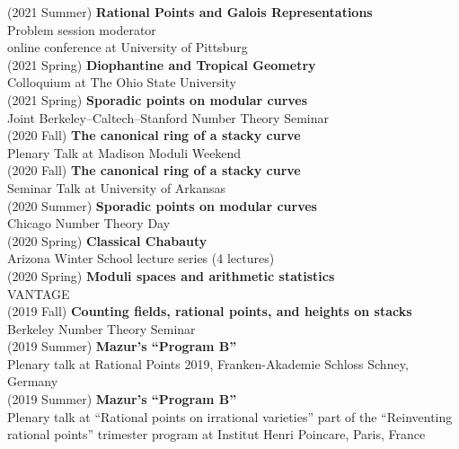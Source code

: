 \documentclass[margin,line]{res}
\begin{document}
\begin{resume}
(2021 Summer) \textbf{Rational Points and Galois Representations}\\
Problem session moderator\\ online conference at University of Pittsburg
\vspace{.05cm}\\
(2021 Spring) \textbf{Diophantine and Tropical Geometry}\\
Colloquium at The Ohio State University 
\vspace{.05cm}\\
(2021 Spring) \textbf{Sporadic points on modular curves}\\
Joint Berkeley--Caltech--Stanford Number Theory Seminar
\vspace{.05cm}\\
(2020 Fall) \textbf{The canonical ring of a stacky curve}\\  
Plenary Talk at Madison Moduli Weekend 
\vspace{.05cm}\\
(2020 Fall) \textbf{The canonical ring of a stacky curve}\\  
Seminar Talk at University of Arkansas
\vspace{.05cm}\\
(2020 Summer) \textbf{Sporadic points on modular curves}\\
Chicago Number Theory Day 
\vspace{.05cm}\\
(2020 Spring) \textbf{Classical Chabauty}\\
Arizona Winter School lecture series (4 lectures)
\vspace{.05cm}\\
(2020 Spring) \textbf{Moduli spaces and arithmetic statistics}\\
VANTAGE
\vspace{.05cm}\\
(2019 Fall) \textbf{Counting fields, rational points, and heights on stacks}\\
Berkeley Number Theory Seminar
\vspace{.05cm}\\
(2019 Summer) \textbf{Mazur's ``Program B''}\\  
Plenary talk at Rational Points 2019, Franken-Akademie Schloss Schney, Germany
\vspace{.05cm}\\
(2019 Summer) \textbf{Mazur's ``Program B''}\\  
Plenary talk at ``Rational points on irrational varieties'' part of the  ``Reinventing rational points'' trimester program at Institut Henri Poincare, Paris, France

\end{resume}
\end{document}
